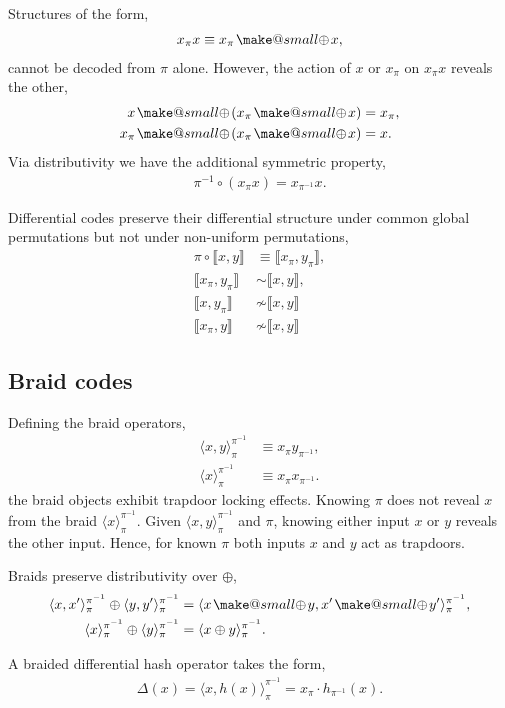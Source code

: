 \documentclass[twocolumn, aps, amsmath, amssymb, nofootinbib, superscriptaddress, longbibliography, doublefloatfix, table-of-contents, eqsecnum, rmp]{revtex4-2}
\makeatletter
\def\diff#1#2{\llbracket #1,#2\rrbracket}
\def\symbraid#1{\langle#1\rangle_{\pi}^{\pi^{-1}}}
\newcommand{\soplus}{{{\hspace{1pt}}{\mathbin{\mathpalette\make@small{\mathbin\oplus}}}}{\hspace{1pt}}}
\newcommand{\make@small}[2]{%
  \vcenter{\hbox{%
    \scalebox{0.6}{$\m@th#1#2$}%
  }}%
}
\makeatother
\begin{document}
Structures of the form,
\begin{align}
	x_\pi x \equiv x_\pi \soplus x,
\end{align}
cannot be decoded from $\pi$ alone. However, the action of $x$ or $x_\pi$ on $x_\pi x$ reveals the other,
\begin{align}
	x \soplus (x_\pi \soplus x) & = x_\pi,\nonumber\\
	x_\pi \soplus (x_\pi \soplus x) &= x.
\end{align}
Via distributivity we have the additional symmetric property,
\begin{align}
	\pi^{-1} \circ (x_\pi x)	 = x_{\pi^{-1}} x.
\end{align}

Differential codes preserve their differential structure under common global permutations but not under non-uniform permutations,
\begin{align}
	\pi\circ \diff{x}{y}	 &\equiv \diff{x_\pi}{y_\pi},\nonumber\\
 	\diff{x_\pi}{y_\pi} &\sim \diff{x}{y},\nonumber\\
	\diff{x}{y_\pi} &\not\sim \diff{x}{y} \nonumber\\
	\diff{x_\pi}{y} &\not\sim \diff{x}{y}
\end{align}

\subsection{Braid codes}

Defining the braid operators,
\begin{align}
	\symbraid{x,y} &\equiv x_{\pi} y_{\pi^{-1}}, \nonumber\\
	\symbraid{x} &\equiv x_{\pi} x_{\pi^{-1}}.
\end{align}
the braid objects exhibit trapdoor locking effects. Knowing $\pi$ does not reveal $x$ from the braid $\symbraid{x}$. Given $\symbraid{x,y}$ and $\pi$, knowing either input $x$ or $y$ reveals the other input. Hence, for known $\pi$ both inputs $x$ and $y$ act as trapdoors.

Braids preserve distributivity over $\oplus$,
\begin{align}
	\symbraid{x,x'} \oplus \symbraid{y,y'} &= \symbraid{x\soplus y, x'\soplus y'},\nonumber\\
	\symbraid{x} \oplus \symbraid{y} &= \symbraid{x\oplus y}.
\end{align}

A braided differential hash operator takes the form,
\begin{align}
	\Delta(x) = \symbraid{x,h(x)} = x_\pi \cdot h_{\pi^{-1}}(x).
\end{align}
\end{document}
